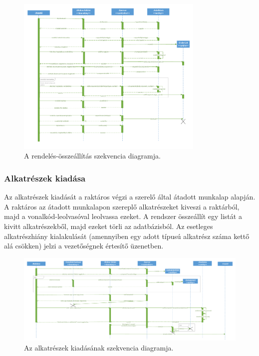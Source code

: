 \documentclass[12pt]{article}\usepackage[left=20mm,right=20mm,top=14mm,bottom=20mm]{geometry}
\begin{document}
\begin{figure}[!h]
    \centering
        \includegraphics[width=0.8\textwidth]{kepek/Rendeles_szekvencia.pdf}
        \caption{A rendelés-összeállítás szekvencia diagramja.}
\end{figure}

\thispagestyle{empty}
\begin{landscape}
\subsubsection{Alkatrészek kiadása}
Az alkatrészek kiadását a raktáros végzi a szerelő által átadott munkalap alapján. 
A raktáros az átadott munkalapon szereplő alkatrészeket kiveszi a raktárból, majd a vonalkód-leolvasóval leolvassa ezeket. 
A rendszer összeállít egy listát a kivitt alkatrészekből, majd ezeket törli az adatbázisból.
Az esetleges alkatrészhiány kialakulását (amennyiben egy adott típusú alkatrész száma kettő alá csökken) jelzi a vezetőségnek értesítő üzenetben. 

\begin{figure}[!h]
    \centering
        \includegraphics[width=1.4\textwidth]{kepek/kiadas_szekvencia.pdf}
        \caption{Az alkatrészek kiadásának szekvencia diagramja.}
\end{figure}
\end{landscape}
\end{document}
